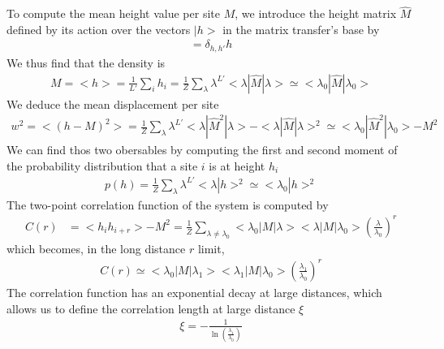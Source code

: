 To compute the mean height value per site $M$, we introduce the height matrix $\hat{M}$ defined by its action over the vectors $|h>$ in the matrix transfer's base by
\begin{align}
= \delta_{h,h'} h
\end{align}
We thus find that the density is
\begin{align}
M = < h > = \frac{1}{L'} \sum_i h_i = \frac{1}{Z} \sum_\lambda \lambda^{L'} < \lambda | \hat{M} | \lambda > \simeq < \lambda_0 | \hat{M} | \lambda_0 > 
\label{tm-magnetisation}
\end{align}
We deduce the mean displacement per site
\begin{align}
w^2 = < (h - M)^2 > = \frac{1}{Z} \sum_\lambda \lambda^{L'} < \lambda | \hat{M}^2 | \lambda > - < \lambda | \hat{M}| \lambda >^2 \simeq < \lambda_0 | \hat{M}^2 | \lambda_0 > - M^2
\end{align}
We can find thos two obersables by computing the first and second moment of the probability distribution that a site $i$ is at height $h_i$
\begin{align}
p(h) = \frac{1}{Z} \sum_\lambda \lambda^{L'} <\lambda | h >^2 \simeq < \lambda_0 | h >^2
\end{align}
The two-point correlation function of the system is computed by
\begin{align}
C(r) &= < h_i h_{i+r} > - M^2 = \frac{1}{Z} \sum_{\lambda \neq \lambda_0} < \lambda_0 | M | \lambda > < \lambda | M | \lambda_0 > \left( \frac{\lambda}{\lambda_0} \right)^r 
\end{align}
which becomes, in the long distance $r$ limit, 
\begin{align}
C(r) \simeq < \lambda_0 | M | \lambda_1 > < \lambda_1 | M | \lambda_0 > \left( \frac{\lambda_1}{\lambda_0} \right)^r
\end{align}
The correlation function has an exponential decay at large distances, which allows us to define the correlation length at large distance $\xi$
\begin{align}
\xi = - \frac{1}{\ln(\frac{\lambda_1}{\lambda_0})}
\label{longueur-correl-thermo}
\end{align}

